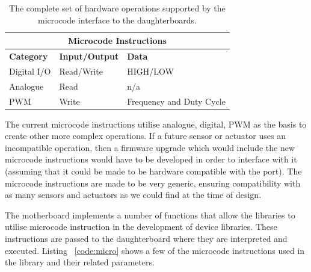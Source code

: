 	\begin{table}[h] 
        \centering
          \scriptsize {%
	      \begin{tabular}{|l|l|l|}
            \toprule
	        \multicolumn{3}{c}{\textbf{Microcode Instructions}} \\\hline
            \textbf{Category} & \textbf{Input/Output} & \textbf{Data}\\\hline
            Digital I/O  & Read/Write & HIGH/LOW \\\hline
            Analogue & Read & n/a \\\hline
            PWM & Write & Frequency and Duty Cycle \\\hline
            \end{tabular} 
            }
	  \caption{The complete set of hardware operations supported by the
	    microcode interface to the daughterboards.}%
	  \label{tab:microcode}
	\end{table}
	\normalsize
	
 The current microcode instructions utilise analogue, digital, PWM as the basis to create other more complex operations. If a future sensor or actuator uses an incompatible operation, then a firmware upgrade which would include the new microcode instructions would have to be developed in order to interface with it (assuming that it could be made to be hardware compatible with the port). The microcode instructions are made to be very generic, ensuring compatibility with as many sensors and actuators as we could find at the time of design.

	The motherboard implements a number of functions that allow the libraries to utilise microcode instruction in the development of device libraries. These instructions are passed to the daughterboard where they are interpreted and executed. Listing ~\ref{code:micro} shows a few of the microcode instructions used in the \xten library and their related parameters.
	
